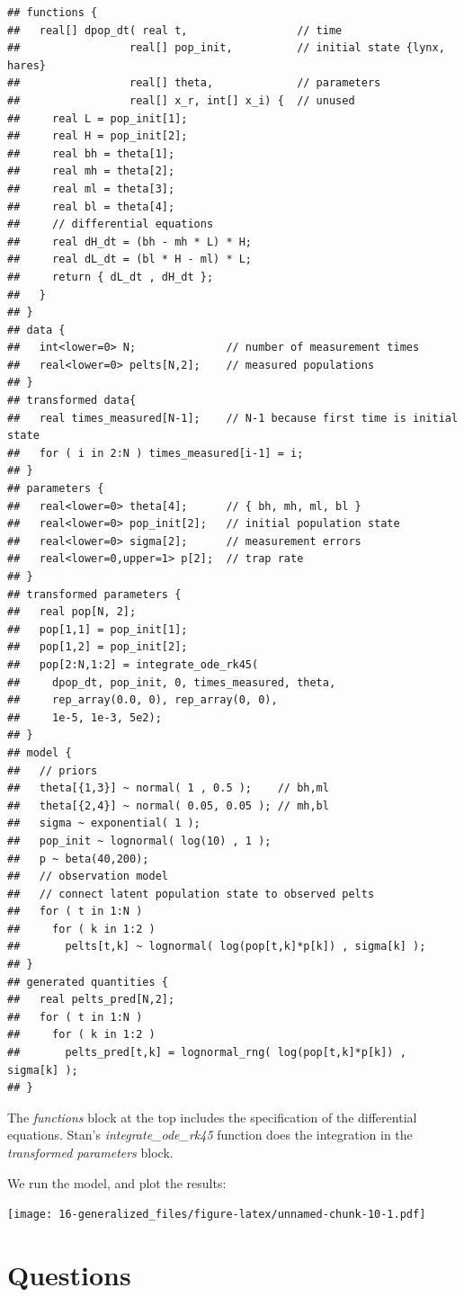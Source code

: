 \documentclass[
]{book}
\begin{document}
\begin{verbatim}
## functions {
##   real[] dpop_dt( real t,                 // time
##                 real[] pop_init,          // initial state {lynx, hares}
##                 real[] theta,             // parameters
##                 real[] x_r, int[] x_i) {  // unused
##     real L = pop_init[1];
##     real H = pop_init[2];
##     real bh = theta[1];
##     real mh = theta[2];
##     real ml = theta[3];
##     real bl = theta[4];
##     // differential equations
##     real dH_dt = (bh - mh * L) * H;
##     real dL_dt = (bl * H - ml) * L;
##     return { dL_dt , dH_dt };
##   }
## }
## data {
##   int<lower=0> N;              // number of measurement times
##   real<lower=0> pelts[N,2];    // measured populations
## }
## transformed data{
##   real times_measured[N-1];    // N-1 because first time is initial state
##   for ( i in 2:N ) times_measured[i-1] = i;
## }
## parameters {
##   real<lower=0> theta[4];      // { bh, mh, ml, bl }
##   real<lower=0> pop_init[2];   // initial population state
##   real<lower=0> sigma[2];      // measurement errors
##   real<lower=0,upper=1> p[2];  // trap rate
## }
## transformed parameters {
##   real pop[N, 2];
##   pop[1,1] = pop_init[1];
##   pop[1,2] = pop_init[2];
##   pop[2:N,1:2] = integrate_ode_rk45(
##     dpop_dt, pop_init, 0, times_measured, theta,
##     rep_array(0.0, 0), rep_array(0, 0),
##     1e-5, 1e-3, 5e2);
## }
## model {
##   // priors
##   theta[{1,3}] ~ normal( 1 , 0.5 );    // bh,ml
##   theta[{2,4}] ~ normal( 0.05, 0.05 ); // mh,bl
##   sigma ~ exponential( 1 );
##   pop_init ~ lognormal( log(10) , 1 );
##   p ~ beta(40,200);
##   // observation model
##   // connect latent population state to observed pelts
##   for ( t in 1:N )
##     for ( k in 1:2 )
##       pelts[t,k] ~ lognormal( log(pop[t,k]*p[k]) , sigma[k] );
## }
## generated quantities {
##   real pelts_pred[N,2];
##   for ( t in 1:N )
##     for ( k in 1:2 )
##       pelts_pred[t,k] = lognormal_rng( log(pop[t,k]*p[k]) , sigma[k] );
## }
\end{verbatim}

The \emph{functions} block at the top includes the specification of the differential equations. Stan's \emph{integrate\_ode\_rk45} function does the integration in the \emph{transformed parameters} block.

We run the model, and plot the results:

\texttt{[image: 16-generalized\_files/figure-latex/unnamed-chunk-10-1.pdf]}

\hypertarget{questions-15}{%
\section{Questions}\label{questions-15}}
\end{document}

